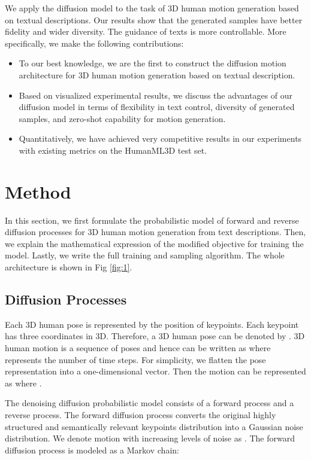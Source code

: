\documentclass{article}
\begin{document}
We apply the diffusion model to the task of 3D human motion generation based on textual descriptions. Our results show that the generated samples have better fidelity and wider diversity. The guidance of texts is more controllable. More specifically, we make the following contributions:

\begin{itemize}
    \item To our best knowledge, we are the first to construct the diffusion motion architecture for 3D human motion generation based on textual description.
    \item Based on visualized experimental results, we discuss the advantages of our diffusion model in terms of flexibility in text control, diversity of generated samples, and zero-shot capability for motion generation.
    \item Quantitatively, we have achieved very competitive  results in our experiments with existing metrics on the HumanML3D test set.
\end{itemize}



\section{Method}
In this section, we first formulate the probabilistic model of forward and reverse diffusion processes for 3D human motion generation from text descriptions. Then, we explain the mathematical expression of the modified objective for training the model. Lastly, we write the full training and sampling algorithm. The whole architecture is shown in Fig \ref{fig:1}.

\subsection{Diffusion Processes}
Each 3D human pose is represented by the position of   keypoints. Each keypoint has three coordinates in 3D. Therefore, a 3D human pose can be denoted by . 3D human motion is a sequence of poses and hence can be written as  where  represents the number of time steps. For simplicity, we flatten the pose representation into a one-dimensional vector. Then the motion can be represented as  where . 

The denoising diffusion probabilistic model consists of a forward process and a reverse process. The forward diffusion process converts the original highly structured and semantically relevant keypoints distribution into a Gaussian noise distribution. We denote motion with increasing levels of noise as . The forward diffusion process is modeled as a Markov chain:
\end{document}
